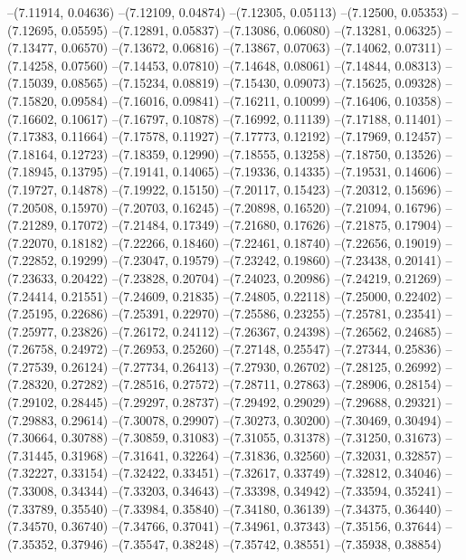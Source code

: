 --(7.11914, 0.04636)
--(7.12109, 0.04874)
--(7.12305, 0.05113)
--(7.12500, 0.05353)
--(7.12695, 0.05595)
--(7.12891, 0.05837)
--(7.13086, 0.06080)
--(7.13281, 0.06325)
--(7.13477, 0.06570)
--(7.13672, 0.06816)
--(7.13867, 0.07063)
--(7.14062, 0.07311)
--(7.14258, 0.07560)
--(7.14453, 0.07810)
--(7.14648, 0.08061)
--(7.14844, 0.08313)
--(7.15039, 0.08565)
--(7.15234, 0.08819)
--(7.15430, 0.09073)
--(7.15625, 0.09328)
--(7.15820, 0.09584)
--(7.16016, 0.09841)
--(7.16211, 0.10099)
--(7.16406, 0.10358)
--(7.16602, 0.10617)
--(7.16797, 0.10878)
--(7.16992, 0.11139)
--(7.17188, 0.11401)
--(7.17383, 0.11664)
--(7.17578, 0.11927)
--(7.17773, 0.12192)
--(7.17969, 0.12457)
--(7.18164, 0.12723)
--(7.18359, 0.12990)
--(7.18555, 0.13258)
--(7.18750, 0.13526)
--(7.18945, 0.13795)
--(7.19141, 0.14065)
--(7.19336, 0.14335)
--(7.19531, 0.14606)
--(7.19727, 0.14878)
--(7.19922, 0.15150)
--(7.20117, 0.15423)
--(7.20312, 0.15696)
--(7.20508, 0.15970)
--(7.20703, 0.16245)
--(7.20898, 0.16520)
--(7.21094, 0.16796)
--(7.21289, 0.17072)
--(7.21484, 0.17349)
--(7.21680, 0.17626)
--(7.21875, 0.17904)
--(7.22070, 0.18182)
--(7.22266, 0.18460)
--(7.22461, 0.18740)
--(7.22656, 0.19019)
--(7.22852, 0.19299)
--(7.23047, 0.19579)
--(7.23242, 0.19860)
--(7.23438, 0.20141)
--(7.23633, 0.20422)
--(7.23828, 0.20704)
--(7.24023, 0.20986)
--(7.24219, 0.21269)
--(7.24414, 0.21551)
--(7.24609, 0.21835)
--(7.24805, 0.22118)
--(7.25000, 0.22402)
--(7.25195, 0.22686)
--(7.25391, 0.22970)
--(7.25586, 0.23255)
--(7.25781, 0.23541)
--(7.25977, 0.23826)
--(7.26172, 0.24112)
--(7.26367, 0.24398)
--(7.26562, 0.24685)
--(7.26758, 0.24972)
--(7.26953, 0.25260)
--(7.27148, 0.25547)
--(7.27344, 0.25836)
--(7.27539, 0.26124)
--(7.27734, 0.26413)
--(7.27930, 0.26702)
--(7.28125, 0.26992)
--(7.28320, 0.27282)
--(7.28516, 0.27572)
--(7.28711, 0.27863)
--(7.28906, 0.28154)
--(7.29102, 0.28445)
--(7.29297, 0.28737)
--(7.29492, 0.29029)
--(7.29688, 0.29321)
--(7.29883, 0.29614)
--(7.30078, 0.29907)
--(7.30273, 0.30200)
--(7.30469, 0.30494)
--(7.30664, 0.30788)
--(7.30859, 0.31083)
--(7.31055, 0.31378)
--(7.31250, 0.31673)
--(7.31445, 0.31968)
--(7.31641, 0.32264)
--(7.31836, 0.32560)
--(7.32031, 0.32857)
--(7.32227, 0.33154)
--(7.32422, 0.33451)
--(7.32617, 0.33749)
--(7.32812, 0.34046)
--(7.33008, 0.34344)
--(7.33203, 0.34643)
--(7.33398, 0.34942)
--(7.33594, 0.35241)
--(7.33789, 0.35540)
--(7.33984, 0.35840)
--(7.34180, 0.36139)
--(7.34375, 0.36440)
--(7.34570, 0.36740)
--(7.34766, 0.37041)
--(7.34961, 0.37343)
--(7.35156, 0.37644)
--(7.35352, 0.37946)
--(7.35547, 0.38248)
--(7.35742, 0.38551)
--(7.35938, 0.38854)
